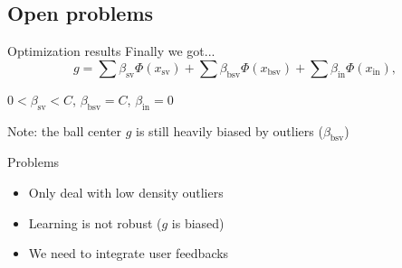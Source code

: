 \subsection{Open problems}
\begin{frame}{Optimization results}
Finally we got...
\vskip10pt
\[
g=\sum\beta_{\mathrm{sv}}\Phi(x_{\mathrm{sv}}) + \sum\beta_{\mathrm{bsv}}\Phi(x_{\mathrm{bsv}}) + \sum\beta_{\mathrm{in}}\Phi(x_{\mathrm{in}}),
\]
\begin{center}
$0 < \beta_{\mathrm{sv}} < C$, $\beta_{\mathrm{bsv}}=C$, $\beta_{\mathrm{in}}=0$
\end{center}
\pause
\vskip40pt
\color{red} Note: the ball center $g$ is still heavily biased by outliers ($\beta_{\mathrm{bsv}}$)
\end{frame}
\begin{frame}{Problems}
\begin{itemize}
\item Only deal with low density outliers
\item Learning is not robust ($g$ is biased)
\item We need to integrate user feedbacks
\end{itemize}
\end{frame}
